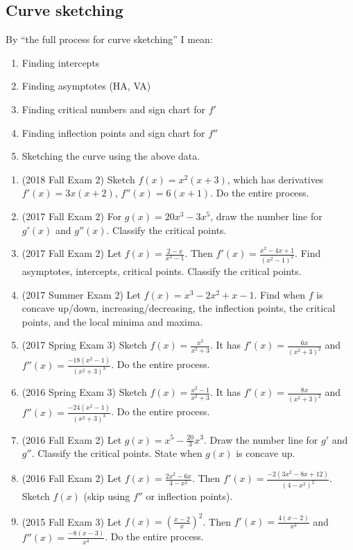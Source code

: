 \documentclass[10pt]{scrartcl}
\begin{document}
\subsection{Curve sketching}
\begin{tcolorbox}
By ``the full process for curve sketching'' I mean:
\begin{enumerate}
\item Finding intercepts
\item Finding asymptotes (HA, VA)
\item Finding critical numbers and sign chart for $f'$
\item Finding inflection points and sign chart for $f''$
\item Sketching the curve using the above data.
\end{enumerate}
\end{tcolorbox}

\begin{enumerate}
\item (2018 Fall Exam 2) Sketch $f(x) = x^2(x+3)$, which has derivatives $f'(x) = 3x(x+2)$, $f''(x)=6(x+1)$. Do the entire process.
\item (2017 Fall Exam 2) For $g(x) = 20x^3 - 3x^5$, draw the number line for $g'(x)$ and $g''(x)$. Classify the critical points.
\item (2017 Fall Exam 2) Let $f(x) = \frac{2-x}{x^2 - 1}$. Then $f'(x) = \frac{x^2- 4x+1}{(x^2-1)^2}$. Find asymptotes, intercepts, critical points. Classify the critical points.
\item (2017 Summer Exam 2) Let $f(x) = x^3 - 2x^2 + x - 1$. Find when $f$ is concave up/down, increasing/decreasing, the inflection points, the critical points, and the local minima and maxima. 
\item (2017 Spring Exam 3) Sketch $f(x) = \frac{x^2}{x^2 + 3}$. It has $f'(x) = \frac{6x}{(x^2+3)^2}$ and $f''(x) = \frac{-18(x^2-1)}{(x^2+3)^3}$. Do the entire process.
\item (2016 Spring Exam 3) Sketch $f(x) = \frac{x^2- 1}{x^2 + 3}$. It has $f'(x) = \frac{8x}{(x^2+3)^2}$ and $f''(x) = \frac{-24(x^2-1)}{(x^2+3)^3}$. Do the entire process.
\item (2016 Fall Exam 2) Let $g(x) = x^5 - \frac{20}{3} x^3$. Draw the number line for $g'$ and $g''$. Classify the critical points. State when $g(x)$ is concave up.
\item (2016 Fall Exam 2) Let $f(x) = \frac{2x^2-6x}{4-x^2}$. Then $f'(x) = \frac{-2(3x^2-8x+12)}{(4-x^2)^2}$. Sketch $f(x)$ (skip using $f''$ or inflection points).
\item (2015 Fall Exam 3) Let $f(x) = \left( \frac{x-2}{x} \right)^2$. Then $f'(x) = \frac{4(x-2)}{x^3}$ and $f''(x) = \frac{-8(x-3)}{x^4}$. Do the entire process.
\end{enumerate}
\end{document}
